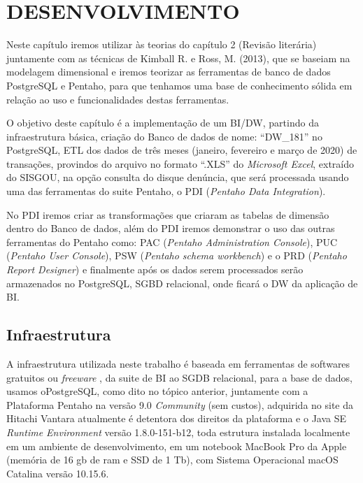 %
%

\chapter{DESENVOLVIMENTO}

Neste cap\'{i}tulo iremos utilizar \`{a}s teorias do cap\'{i}tulo 2 (Revis\~{a}o liter\'{a}ria) juntamente com as t\'{e}cnicas de Kimball R. e Ross, M. (2013), que se baseiam na modelagem dimensional e iremos teorizar as ferramentas de banco de dados PostgreSQL e Pentaho, para que tenhamos uma base de conhecimento s\'olida em rela\c{c}\~{a}o ao uso e funcionalidades destas ferramentas.

O objetivo deste cap\'{i}tulo \'{e} a implementa\c{c}\~{a}o de um BI/DW, partindo da infraestrutura b\'{a}sica, cria\c{c}\~{a}o do Banco de dados de nome: ``DW\_181'' no PostgreSQL, ETL dos dados de três meses  (janeiro, fevereiro e mar\c{c}o de 2020) de transa\c{c}\~{o}es, provindos do arquivo no formato ``.XLS'' do \textit{Microsoft Excel},  extra\'{i}do do SISGOU, na op\c{c}\~{a}o consulta do disque denúncia, que ser\'{a} processada usando uma das ferramentas do suite Pentaho, o PDI (\textit{Pentaho Data Integration}).

No PDI iremos criar as transforma\c{c}\~{o}es que criaram as tabelas de dimens\~{a}o dentro do Banco de dados, al\'{e}m do PDI iremos demonstrar o uso das outras ferramentas do Pentaho como: PAC (\textit{Pentaho Administration Console}), PUC (\textit{Pentaho User Console}), PSW (\textit{Pentaho schema workbench}) e o PRD (\textit{Pentaho Report Designer}) e finalmente ap\'os os dados serem processados ser\~{a}o armazenados no PostgreSQL, SGBD relacional, onde ficar\'{a} o DW da aplica\c{c}\~{a}o de BI.

\section{Infraestrutura}

A infraestrutura utilizada neste trabalho \'{e} baseada em ferramentas de softwares gratuitos ou \textit{freeware} , da suite de BI ao SGDB relacional, para a base de dados, usamos oPostgreSQL, como dito no t\'opico anterior, juntamente com a Plataforma Pentaho na vers\~{a}o 9.0 \textit{Community} (sem custos), adquirida no site da Hitachi Vantara atualmente \'{e} detentora dos direitos da plataforma e o Java SE \textit{Runtime Environment} vers\~{a}o 1.8.0-151-b12, toda estrutura instalada localmente em um ambiente de desenvolvimento, em um notebook MacBook Pro da Apple (mem\'oria de 16 gb de ram e SSD de 1 Tb), com Sistema Operacional macOS Catalina vers\~{a}o 10.15.6.

